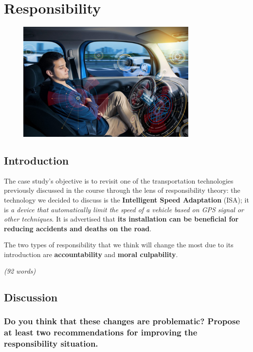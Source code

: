 \chapter{Responsibility}
\begin{figure}[h]
\centering
\includegraphics[width=0.8\textwidth]{Capitoli_Report/7.1_Responsibility.png}
\caption{\cite{picresponsibility}}
\label{fig:responsibility}
\end{figure}
\newpage
\section{Introduction}
The case study's objective is to revisit one of the transportation technologies previously discussed in the course through the lens of responsibility theory: the technology we decided to discuss is the \textbf{Intelligent Speed Adaptation} (ISA); it is \textit{a device that automatically limit the speed of a vehicle based on GPS signal or other techniques}. It is advertised that \textbf{its installation can be beneficial for reducing accidents and deaths on the road}.

The two types of responsibility that we think will change the most due to its introduction are \textbf{accountability} and \textbf{moral culpability}.

\emph{(92 words)}

\section{Discussion}
\subsection{Do you think that these changes are problematic? Propose at least two recommendations for improving the responsibility situation.}

